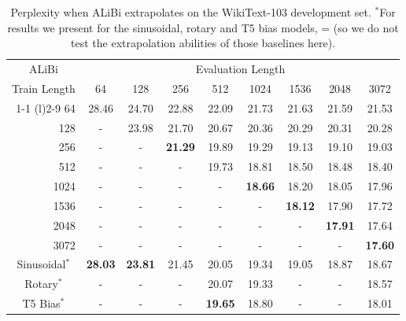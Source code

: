 \begin{table}[h]
\caption{Perplexity when ALiBi extrapolates on the WikiText-103 development set. $^*$For results we present for the sinusoidal, rotary and T5 bias models, \lt = \li (so we do not test the extrapolation abilities of those baselines here). 
}
\label{tab:LSB_wt103}
\begin{center}
\begin{tabular}{@{}rcccccccc@{}}
\toprule
\multicolumn{1}{c}{ALiBi } &  \multicolumn{8}{c}{Evaluation Length} \\  
Train Length & 64 & 128 & 256 & 512 & 1024 & 1536 & 2048 & 3072 \\\cmidrule(r){1-1} \cmidrule(l){2-9}
64   &28.46&24.70&22.88&22.09&21.73&21.63&21.59&21.53\\
128  &-&23.98&21.70&20.67&20.36&20.29&20.31&20.28\\
256  &-&-&\textbf{21.29}&19.89&19.29&19.13&19.10&19.03\\
512  &-&-&-&19.73&18.81&18.50&18.48    &18.40\\
1024 &-&-&-&-&\textbf{18.66}&18.20&18.05        &17.96\\
1536 &-  &  -&-  &  -&-  &\textbf{18.12 }& 17.90&17.72  \\
2048 & - & - & - &  -& - & -&\textbf{17.91 }    &17.64 \\
3072 &  -&-  &  -&  -&  -&- &-         &\textbf{17.60} \\ 

\midrule %
\midrule
\multicolumn{1}{c}{Sinusoidal$^*$ }&\textbf{ 28.03}&\textbf{ 23.81}& 21.45& 20.05&19.34&19.05&18.87&18.67\\
\multicolumn{1}{c}{Rotary$^*$ } &- &-&-&20.07&19.33&-&-&18.57\\
\multicolumn{1}{c}{T5 Bias$^*$ }&- &-&-&\textbf{19.65}&18.80&-&-&18.01\\

\bottomrule
\end{tabular}
\end{center}
\end{table}


